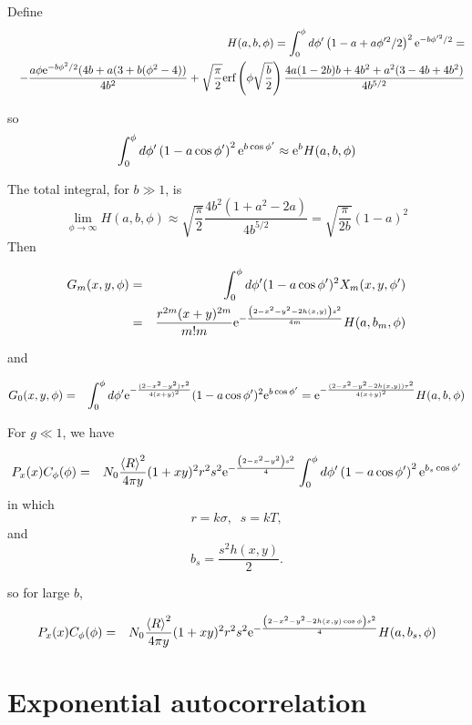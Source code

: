 \documentclass[11pt,openany]{report}
\newcommand{\e}{{\rm e}}
\begin{document}
{{Define
\begin{eqnarray}
&&H(a,b,\phi)=\int_{0}^{\phi}d\phi'\left(1-a+a\phi'^{2}/2\right)^{2}\e^{-b\phi'^{2}/2}=\\
&&-\frac{a\phi\e^{-b\phi^{2}/2}(4b+a(3+b(\phi^{2}-4))}{4b^{2}}+\sqrt{\frac{\pi}{2}}\textrm{erf}\left(\phi\sqrt{\frac{b}{2}}\right)\frac{4a(1-2b)b+4b^{2}+a^{2}(3-4b+4b^{2})}{4b^{5/2}}\end{eqnarray}

so
$$\int_{0}^{\phi}d\phi'\left(1-a\cos\phi' \right)^{2}\e^{b\cos\phi'}\approx\e^{b}H(a,b,\phi)$$


The total integral, for $b\gg1$, is
$$\lim_{\phi\rightarrow\infty}H(a,b,\phi)\approx\sqrt{\frac{\pi}{2}}\frac{4b^{2}(1+a^{2}-2a)}{4b^{5/2}}=\sqrt{\frac{\pi}{2b}}(1-a)^{2}$$
Then

\begin{eqnarray}
G_{m}(x,y,\phi)&=&\int_{0}^{\phi}d\phi'(1-a\cos\phi')^{2}X_{m}(x,y,\phi')\\&=&\frac{r^{2m}(x+y)^{2m}}{m!m}\e^{-\frac{\left(2-x^{2}-y^{2}-2h(x,y)\right)s^{2}}{4m}}H(a,b_{m},\phi)\end{eqnarray}

and

\begin{eqnarray}
G_{0}(x,y,\phi)&=&\int_{0}^{\phi}d\phi'\e^{-\frac{(2-x^{2}-y^{2})\tau^{2}}{4(x+y)^{2}}}(1-a\cos\phi')^{2}\e^{b\cos\phi'}=\e^{-\frac{(2-x^{2}-y^{2}-2h(x,y))\tau^{2}}{4(x+y)^{2}}}H(a,b,\phi)
\end{eqnarray}

For $g\ll 1$, we have


\begin{eqnarray}
P_x(x)C_{\phi}(\phi)
&=& N_{0}\frac{\left<R\right>^{2}}{4\pi y}(1+xy)^{2}r^{2}s^{2}\e^{-\frac{\left(2-x^{2}-y^{2}\right)s^{2}}{4}}
\int_{0}^{\phi}d\phi'\left(1-a\cos\phi'\right)^{2}\e^{b_{s}\cos\phi'}
\end{eqnarray}
in which
$$r=k\sigma,\;\;s=kT,$$
and
$$b_{s}=\frac{s^{2}h(x,y)}{2}.$$

so for large $b$,

\begin{eqnarray}
P_x(x)C_{\phi}(\phi)&=& N_{0}\frac{\left<R\right>^{2}}{4\pi y}(1+xy)^{2}r^{2}s^{2}\e^{-\frac{\left(2-x^{2}-y^{2}-2h(x,y)\cos\phi\right)s^{2}}{4}}H(a,b_{s},\phi)
\end{eqnarray}

\section{Exponential autocorrelation}

}}
\end{document}
